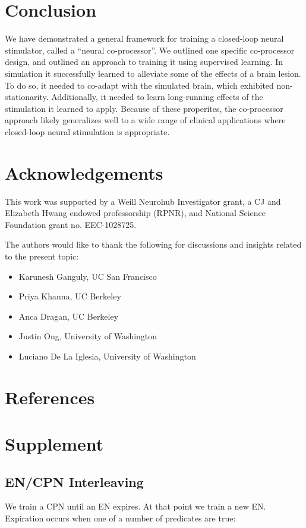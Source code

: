 \documentclass[12pt]{iopart}
\begin{document}
\section{Conclusion}
We have demonstrated a general framework for training a closed-loop neural stimulator,
called a ``neural co-processor''. We outlined one specific co-processor design, and
outlined an approach to training it using supervised learning. In simulation it
successfully learned to alleviate some of the effects of a brain lesion. To do so, it
needed to co-adapt with the simulated brain, which exhibited non-stationarity. Additionally,
it needed to learn long-running effects of the stimulation it learned to apply. Because of
these properites, the co-processor approach likely generalizes well to a wide range of
clinical applications where closed-loop neural stimulation is appropriate.

\section{Acknowledgements}
This work was supported by a Weill Neurohub Investigator grant, a CJ and Elizabeth Hwang
endowed professorship (RPNR), and National Science Foundation grant no. EEC-1028725.

The authors would like to thank the following for discussions and insights related to
the present topic:
\begin{itemize}
	\item Karunesh Ganguly, UC San Francisco
	\item Priya Khanna, UC Berkeley
	\item Anca Dragan, UC Berkeley
	\item Justin Ong, University of Washington
	\item Luciano De La Iglesia, University of Washington
\end{itemize}

\newpage

\section{References}



\newpage

\section{Supplement}
\subsection{EN/CPN Interleaving}
\label{sup:encpninter}
We train a CPN until an EN expires. At that point we train a new EN. Expiration
occurs when one of a number of predicates are true:
\end{document}
